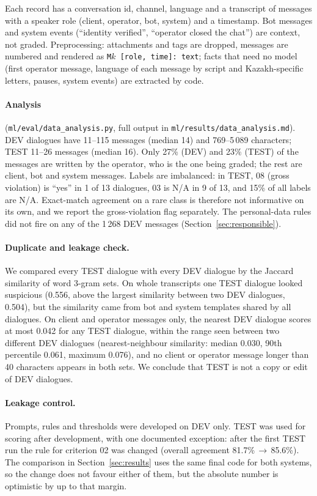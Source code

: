 \documentclass[11pt,a4paper]{article}
\begin{document}
Each record has a conversation id, channel, language and a transcript of messages with a speaker role
(client, operator, bot, system) and a timestamp. Bot messages and system events (``identity verified'',
``operator closed the chat'') are context, not graded. Preprocessing: attachments and tags are dropped,
messages are numbered and rendered as \texttt{M$k$ [role, time]: text}; facts that need no model (first operator
message, language of each message by script and Kazakh-specific letters, pauses, system events) are
extracted by code.

\paragraph{Analysis} (\texttt{ml/eval/data\_analysis.py}, full output in \texttt{ml/results/data\_analysis.md}).
DEV dialogues have 11--115 messages (median 14) and 769--5\,089 characters; TEST 11--26 messages (median 16).
Only 27\% (DEV) and 23\% (TEST) of the messages are written by the operator, who is the one being graded;
the rest are client, bot and system messages. Labels are imbalanced: in TEST, 08 (gross violation) is
``yes'' in 1 of 13 dialogues, 03 is N/A in 9 of 13, and 15\% of all labels are N/A. Exact-match agreement on a
rare class is therefore not informative on its own, and we report the gross-violation flag separately. The
personal-data rules did not fire on any of the 1\,268 DEV messages (Section~\ref{sec:responsible}).

\paragraph{Duplicate and leakage check.} We compared every TEST dialogue with every DEV dialogue by the
Jaccard similarity of word 3-gram sets. On whole transcripts one TEST dialogue looked suspicious (0.556,
above the largest similarity between two DEV dialogues, 0.504), but the similarity came from bot and
system templates shared by all dialogues. On client and operator messages only, the nearest DEV dialogue
scores at most 0.042 for any TEST dialogue, within the range seen between two different DEV dialogues
(nearest-neighbour similarity: median 0.030, 90th percentile 0.061, maximum 0.076), and no client or
operator message longer than 40 characters appears in both sets. We conclude that TEST is not a copy or edit of DEV dialogues.

\paragraph{Leakage control.} Prompts, rules and thresholds were developed on DEV only. TEST was used for
scoring after development, with one documented exception: after the first TEST run the rule for criterion
02 was changed (overall agreement 81.7\%\,$\rightarrow$\,85.6\%). The comparison in Section~\ref{sec:results}
uses the same final code for both systems, so the change does not favour either of them, but the absolute
number is optimistic by up to that margin.
\end{document}
